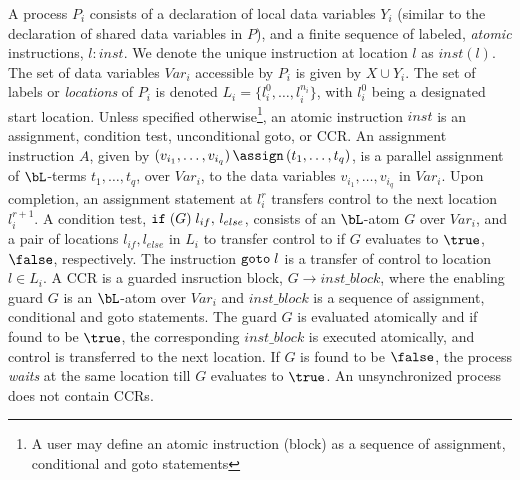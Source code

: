 A process $P_i$ consists of a declaration of local data variables
$Y_i$ (similar to the declaration of shared data variables in $P$),
and a finite sequence of labeled, {\em atomic} instructions, $l:
inst$.  We denote the unique instruction at location $l$ as $inst(l)$.
The set of data variables $Var_i$ accessible by $P_i$ is given by $X
\cup Y_i$. The set of labels or {\em locations} of $P_i$ is denoted
$L_i = \{l_i^0, \ldots, l_i^{n_i}\}$, with $l_i^0$ being a designated
start location. Unless specified otherwise\footnote{A user may define
an atomic instruction (block) as a sequence of assignment, conditional 
and goto statements}, an atomic instruction $inst$ is an assignment,
condition test, unconditional goto, or CCR. An assignment instruction
$A$, given by $(v_{i_1}, \ldots, v_{i_q}) \, {\bf \assign} \, (t_1,
\ldots, t_q)$, is a parallel assignment of $\bL$-terms $t_1, \ldots,
t_q$, over $Var_i$, to the data variables $v_{i_1}, \ldots, v_{i_q}$
in $Var_i$. Upon completion, an assignment statement at $l_i^r$
transfers control to the next location $l_i^{r+1}$. A condition test,
${\tt if} \; (G) \; l_{if},\, l_{else}$, consists of an $\bL$-atom $G$
over $Var_i$, and a pair of locations $l_{if}, l_{else}$ in $L_i$ to
transfer control to if $G$ evaluates to $\true$, $\false$,
respectively. The instruction ${\tt goto} \; l$ is a transfer of
control to location $l \in L_i$. A CCR is a guarded insruction block,
$G \to inst\_block$, where the enabling guard $G$ is an $\bL$-atom
over $Var_i$ and $inst\_block$ is a sequence of assignment,
conditional and goto statements. The guard $G$ is evaluated atomically
and if found to be $\true$, the corresponding $inst\_block$ is
executed atomically, and control is transferred to the next location.
If $G$ is found to be $\false$, the process {\em waits} at the same
location till $G$ evaluates to $\true$. An unsynchronized process does
not contain CCRs.  





